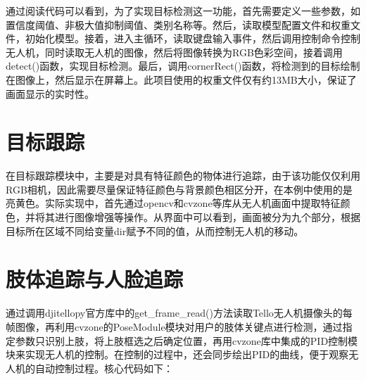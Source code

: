 \documentclass[report, twoside, UTF8, AutoFakeBold = 1, AutoFakeSlant, zihao = -4]{config}
\begin{document}
通过阅读代码可以看到，为了实现目标检测这一功能，首先需要定义一些参数，如置信度阈值、非极大值抑制阈值、类别名称等。然后，读取模型配置文件和权重文件，初始化模型。接着，进入主循环，读取键盘输入事件，然后调用控制命令控制无人机，同时读取无人机的图像，然后将图像转换为RGB色彩空间，接着调用detect()函数，实现目标检测。最后，调用cornerRect()函数，将检测到的目标绘制在图像上，然后显示在屏幕上。此项目使用的权重文件仅有约13MB大小，保证了画面显示的实时性。

\section{目标跟踪}
在目标跟踪模块中，主要是对具有特征颜色的物体进行追踪，由于该功能仅仅利用RGB相机，因此需要尽量保证特征颜色与背景颜色相区分开，在本例中使用的是亮黄色。实际实现中，首先通过opencv和cvzone等库从无人机画面中提取特征颜色，并将其进行图像增强等操作。从界面中可以看到，画面被分为九个部分，根据目标所在区域不同给变量dir赋予不同的值，从而控制无人机的移动。


\section{肢体追踪与人脸追踪}
通过调用djitellopy官方库中的get\_frame\_read()方法读取Tello无人机摄像头的每帧图像，再利用cvzone的PoseModule模块对用户的肢体关键点进行检测，通过指定参数只识别上肢，将上肢框选之后确定位置，再用cvzone库中集成的PID控制模块来实现无人机的控制。在控制的过程中，还会同步绘出PID的曲线，便于观察无人机的自动控制过程。核心代码如下：
\end{document}
